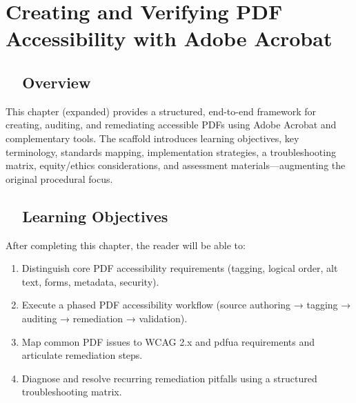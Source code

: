 \chapter{Creating and Verifying PDF Accessibility with Adobe Acrobat}

\section{~~Overview}\label{ch17:sec:overview-expanded}
This chapter (expanded) provides a structured, end-to-end framework for creating, auditing, and remediating accessible PDFs using Adobe Acrobat and complementary tools. The scaffold introduces learning objectives, key terminology, standards mapping, implementation strategies, a troubleshooting matrix, equity/ethics considerations, and assessment materials—augmenting the original procedural focus.

\section{~~Learning Objectives}\label{ch17:sec:learning-objectives}
After completing this chapter, the reader will be able to:
\begin{enumerate}
	\item Distinguish core PDF accessibility requirements (tagging, logical order, alt text, forms, metadata, security).
	\item Execute a phased PDF accessibility workflow (source authoring → tagging → auditing → remediation → validation).
	\item Map common PDF issues to WCAG 2.x and \gls{pdfua} requirements and articulate remediation steps.
	\item Diagnose and resolve recurring remediation pitfalls using a structured troubleshooting matrix.
\end{enumerate}

